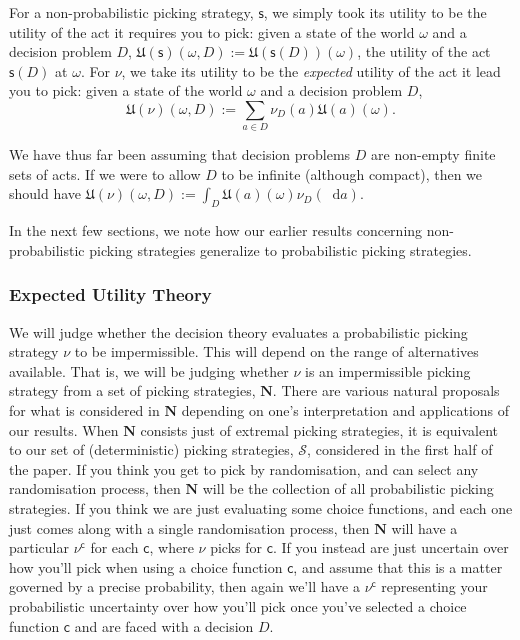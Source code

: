 \documentclass[a4paper]{article}
\newcommand\N{\mathbf{N}}
\renewcommand\S{\mathcal{S}}
\newcommand\s{\mathsf{s}}
\renewcommand\c{\mathsf{c}} %
\newcommand\Exp{\mathsf{Exp}}
\newcommand\EU{\mathrm{EU}}
\newcommand\U{\mathfrak{U}} %
\newcommand{\todoinfo}[2][]{\todo[backgroundcolor=orange!80,bordercolor=black,linecolor=gray!80, #1,inline,caption={}]{#2}}
\renewcommand{\color}[1]{}
\newenvironment{colored}[1]{\leavevmode\color{#1}}{}
\newcommand*\diff{\mathop{}\!\mathrm{d}}
\newenvironment{CCM rewritten}
{\begingroup\color{blue}} %
{\endgroup}              %
\begin{document}
For a non-probabilistic picking strategy, $\s$, we simply took its utility to be the utility of the act it requires you to pick: given a state of the world $\omega$ and a decision problem $D$, $\U(\s)(\omega,D):=\U(\s(D))(\omega)$, the utility of the act $\s(D)$ at $\omega$. For $\nu$, we take its utility to be the \textit{expected} utility of the act it lead you to pick: given a state of the world $\omega$ and a decision problem $D$, $$\U(\nu)(\omega,D):=\sum_{a \in D} \nu_D(a)\U(a)(\omega).$$
\begin{comment}
\begin{colored}{violet}
	If we are allowing $D$ to be infinite (although compact), we should in fact take an integral, $\U(\nu)(\omega,D):=\int_{a \in D} \U(a)(\omega)\,\nu_D(\diff a).$\todo{should we explicitly talk about finitely additive integrals?}
\end{colored}
\end{comment}


{\color{red} We have thus far been assuming that decision problems $D$ are non-empty finite sets of acts. If we were to allow $D$ to be infinite (although compact), then we should have $\U(\nu)(\omega,D):=\int_{D} \U(a)(\omega) \nu_D(\diff a)$.}

In the next few sections, we note how our earlier results concerning non-probabilistic picking strategies generalize to probabilistic picking strategies.
\subsubsection{Expected Utility Theory}
{\color{violet}We will judge whether the decision theory evaluates a probabilistic picking strategy $\nu$ to be impermissible. This will depend on the range of alternatives available. That is, we will be judging whether $\nu$ is an impermissible picking strategy from a set of picking strategies, $\N$. }
There are various natural proposals for what is considered in $\N$ depending on one's interpretation and applications of our results. 
When $\N$ consists just of extremal picking strategies, it is equivalent to our set of (deterministic) picking strategies, $\S$, considered in the first half of the paper. 
If you think you get to pick by randomisation, and can select any randomisation process, then $\N$ will be the collection of all probabilistic picking strategies.
If you think we are just evaluating some choice functions, and each one just comes along with a single randomisation process, then $\N$ will have a particular $\nu^\c$ for each $\c$, where $\nu$ picks for $\c$. 
If you instead are just uncertain over how you'll pick when using a choice function $\c$, and assume that this is a matter governed by a precise probability, then again we'll have a $\nu^\c$ representing your probabilistic uncertainty over how you'll pick once you've selected a choice function $\c$ and are faced with a decision $D$.
\end{document}
